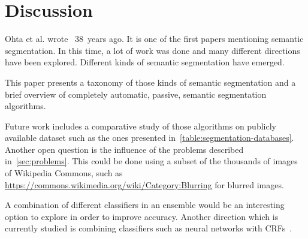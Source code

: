 
\section{Discussion}%
\label{sec:discussion}
Ohta et al. wrote~\cite{ohta1978analysis} 38~years ago. It is one of the first
papers mentioning semantic segmentation. In this time, a lot of work was done
and many different directions have been explored. Different kinds of semantic
segmentation have emerged.

This paper presents a taxonomy of those kinds of semantic segmentation and a
brief overview of completely automatic, passive, semantic segmentation
algorithms.

Future work includes a comparative study of those algorithms on publicly
available dataset such as the ones presented
in~\cref{table:segmentation-databases}. Another open question is the influence
of the problems described in~\cref{sec:problems}. This could be done using a
subset of the thousands of images of Wikipedia Commons, such as \href{https://commons.wikimedia.org/wiki/Category:Blurring}{https://commons.wikimedia.org/wiki/Category:Blurring} for blurred images.

A combination of different classifiers in an ensemble would be an interesting
option to explore in order to improve accuracy. Another direction which is
currently studied is combining classifiers such as neural networks with
\glspl{CRF}~\cite{zheng2015conditional}.
